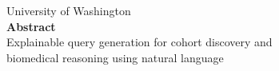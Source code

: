 \documentclass[../main.tex]{subfiles}
\begin{document}
\begin{centering}
University of Washington
\\
\textbf{Abstract}
\\ 
Explainable query generation for cohort discovery and \\biomedical reasoning using natural language
\\ 


\end{centering}
\end{document}

